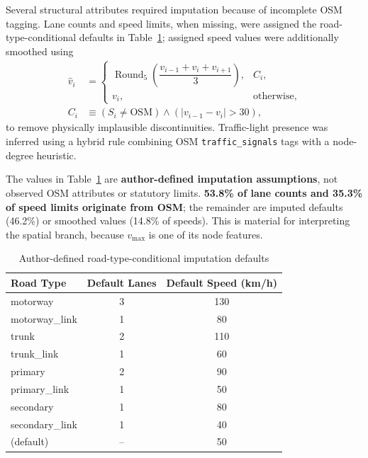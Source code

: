 \documentclass[journal]{IEEEtran}
\begin{document}
Several structural attributes required imputation because of incomplete OSM tagging. Lane counts and speed limits, when missing, were assigned the road-type-conditional defaults in Table~\ref{tab:road_defaults}; assigned speed values were additionally smoothed using
\begin{equation}
  \begin{aligned}
    \hat{v}_i & =
    \begin{cases}
      \operatorname{Round}_5\!\left(\dfrac{v_{i-1}+v_i+v_{i+1}}{3}\right), & C_i,\\
      v_i, & \text{otherwise},
    \end{cases}\\
    C_i & \equiv (S_i \neq \mathrm{OSM}) \land (|v_{i-1}-v_i|>30),
  \end{aligned}
\end{equation}
to remove physically implausible discontinuities. Traffic-light presence was inferred using a hybrid rule combining OSM \texttt{traffic\_signals} tags with a node-degree heuristic.

The values in Table~\ref{tab:road_defaults} are \textbf{author-defined imputation assumptions}, not observed OSM attributes or statutory limits. \textbf{53.8\% of lane counts and 35.3\% of speed limits originate from OSM}; the remainder are imputed defaults (46.2\%) or smoothed values (14.8\% of speeds). This is material for interpreting the spatial branch, because $v_{\max}$ is one of its node features.

\begin{table}[!htbp]
  \centering
  \caption{Author-defined road-type-conditional imputation defaults}
  \label{tab:road_defaults}
  \renewcommand{\arraystretch}{1.15}
  \begin{tabular}{@{}lcc@{}}
    \toprule
    \textbf{Road Type} & \textbf{Default Lanes} & \textbf{Default Speed (km/h)} \\ \midrule
    motorway        & 3  & 130 \\
    motorway\_link  & 1  & 80 \\
    trunk           & 2  & 110 \\
    trunk\_link     & 1  & 60 \\
    primary         & 2  & 90 \\
    primary\_link   & 1  & 50 \\
    secondary       & 1  & 80 \\
    secondary\_link & 1  & 40 \\
    (default)       & -- & 50 \\ \bottomrule
  \end{tabular}
\end{table}
\end{document}
